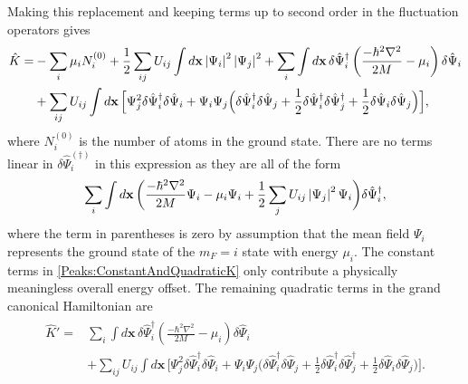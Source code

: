 Making this replacement and keeping terms up to second order in the fluctuation operators gives
\begin{align}
    \begin{split}
        \hat{K} =& -\sum_i \mu_i N_i^{(0)} + \frac{1}{2}\sum_{i j}U_{i j}\int d\mathbf{x} \left|\Psi_i\right|^2\left|\Psi_j\right|^2 + \sum_i \int d\mathbf{x}\, \delta\hat{\Psi}_i^\dagger \left( \frac{-\hbar^2 \nabla^2}{2M} - \mu_i\right)\delta\hat{\Psi}_i\\
        &+ \sum_{i j} U_{i j} \int d\mathbf{x}\, \Big[\Psi_j^2\delta\hat{\Psi}_i^\dagger \delta\hat{\Psi}_i + \Psi_i\Psi_j\Big(\delta\hat{\Psi}_i^\dagger \delta\hat{\Psi}_j + \frac{1}{2} \delta\hat{\Psi}_i^\dagger \delta\hat{\Psi}_j^\dagger + \frac{1}{2}\delta\hat{\Psi}_i \delta\hat{\Psi}_j \Big)\Big],
    \end{split}
\end{align}
where $N_i^{(0)}$ is the number of atoms in the ground state. There are no terms linear in $\delta\hat{\Psi}_i^{(\dagger)}$ in this expression as they are all of the form
\begin{align}
    \sum_i \int d\mathbf{x}\,  \bigg( \frac{-\hbar^2 \nabla^2}{2M}\Psi_i - \mu_i\Psi_i + \frac{1}{2} \sum_j U_{i j} \abs{\Psi_j}^2\Psi_i\bigg) \delta \hat{\Psi}_i^\dagger, \label{Peaks:ConstantAndQuadraticK}
\end{align}
where the term in parentheses is zero by assumption that the mean field $\Psi_i$ represents the ground state of the $m_F=i$ state with energy $\mu_i$. The constant terms in \eqref{Peaks:ConstantAndQuadraticK} only contribute a physically meaningless overall energy offset. The remaining quadratic terms in the grand canonical Hamiltonian are
\begin{align}
    \begin{split}
        \hat{K}' =& \sum_i \int d\mathbf{x}\, \delta\hat{\Psi}_i^\dagger \left( \frac{-\hbar^2 \nabla^2}{2M} - \mu_i\right)\delta\hat{\Psi}_i\\
        &+ \sum_{i j} U_{i j} \int d\mathbf{x}\, \Big[\Psi_j^2\delta\hat{\Psi}_i^\dagger \delta\hat{\Psi}_i + \Psi_i\Psi_j\Big(\delta\hat{\Psi}_i^\dagger \delta\hat{\Psi}_j +\frac{1}{2} \delta\hat{\Psi}_i^\dagger \delta\hat{\Psi}_j^\dagger +  \frac{1}{2}\delta\hat{\Psi}_i \delta\hat{\Psi}_j \Big)\Big].
    \end{split}
    \label{Peaks:QuadraticK}
\end{align}

